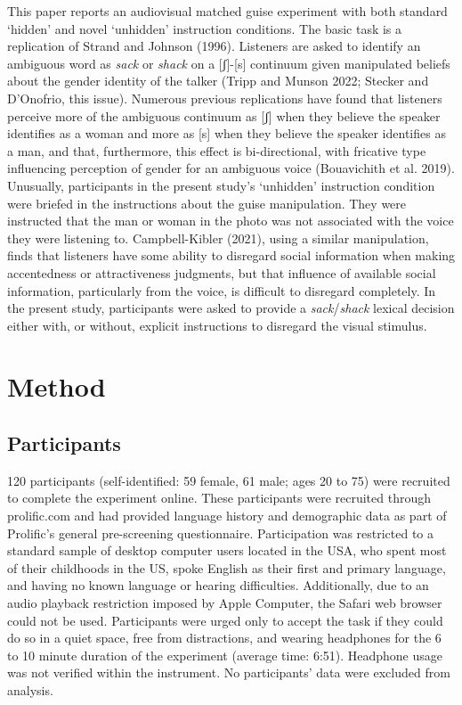 \documentclass[
  letterpaper,
  DIV=11,
  numbers=noendperiod]{scrartcl}
\begin{document}
This paper reports an audiovisual matched guise experiment with both
standard `hidden' and novel `unhidden' instruction conditions. The basic
task is a replication of Strand and Johnson (1996). Listeners are asked
to identify an ambiguous word as \emph{sack} or \emph{shack} on a
{[}ʃ{]}-{[}s{]} continuum given manipulated beliefs about the gender
identity of the talker (Tripp and Munson 2022; Stecker and D'Onofrio,
this issue). Numerous previous replications have found that listeners
perceive more of the ambiguous continuum as {[}ʃ{]} when they believe
the speaker identifies as a woman and more as {[}s{]} when they believe
the speaker identifies as a man, and that, furthermore, this effect is
bi-directional, with fricative type influencing perception of gender for
an ambiguous voice (Bouavichith et al. 2019). Unusually, participants in
the present study's `unhidden' instruction condition were briefed in the
instructions about the guise manipulation. They were instructed that the
man or woman in the photo was not associated with the voice they were
listening to. Campbell-Kibler (2021), using a similar manipulation,
finds that listeners have some ability to disregard social information
when making accentedness or attractiveness judgments, but that influence
of available social information, particularly from the voice, is
difficult to disregard completely. In the present study, participants
were asked to provide a \emph{sack}/\emph{shack} lexical decision either
with, or without, explicit instructions to disregard the visual
stimulus.

\section{Method}\label{sec-method}

\subsection{Participants}\label{sec-participants}

120 participants (self-identified: 59 female, 61 male; ages 20 to 75)
were recruited to complete the experiment online. These participants
were recruited through prolific.com and had provided language history
and demographic data as part of Prolific's general pre-screening
questionnaire. Participation was restricted to a standard sample of
desktop computer users located in the USA, who spent most of their
childhoods in the US, spoke English as their first and primary language,
and having no known language or hearing difficulties. Additionally, due
to an audio playback restriction imposed by Apple Computer, the Safari
web browser could not be used. Participants were urged only to accept
the task if they could do so in a quiet space, free from distractions,
and wearing headphones for the 6 to 10 minute duration of the experiment
(average time: 6:51). Headphone usage was not verified within the
instrument. No participants' data were excluded from analysis.
\end{document}

